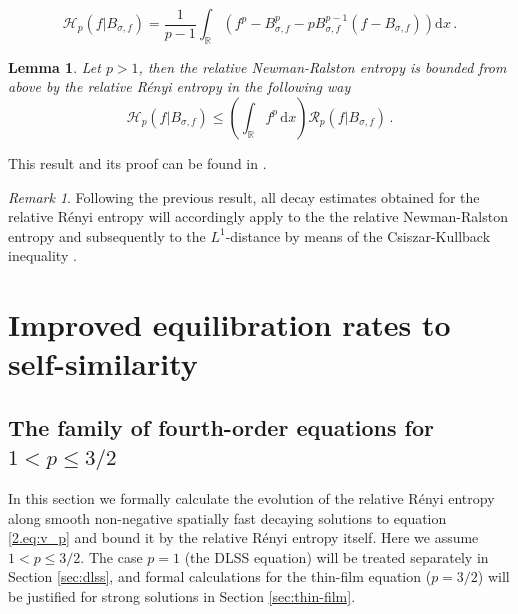 \documentclass[12pt]{amsart}
\newcommand{\R}{{\mathbb R}}
\newcommand{\renyi}{{\mathcal{R}}}
\newcommand{\dd}{{\mathrm{d}}}
\newcommand{\entropy}{\mathcal{H}}
\theoremstyle{plain}
\newtheorem{lemma}[theorem]{Lemma}
\theoremstyle{definition}
\theoremstyle{remark}
\newtheorem{remark}{Remark}[section]
\begin{document}
\begin{equation*}
    \entropy_p(f|B_{\sigma,f}) = \frac{1}{p-1}\int_{\R}\left(f^p - B_{\sigma,f}^p - pB_{\sigma,f}^{p-1}(f - B_{\sigma,f})\right)\dd x\,.
\end{equation*}
\begin{lemma}\label{lem:NR-ren}
    Let $p>1$, then the relative Newman-Ralston entropy is bounded from above by the relative R\'enyi entropy in the following way
    \begin{equation*}
        \entropy_p(f|B_{\sigma,f}) \leq \left(\int_{\R}f^p\,\dd x\right)\renyi_p(f|B_{\sigma,f})\,.
    \end{equation*}
\end{lemma}
\noindent This result and its proof can be found in \cite[Lemma 4.2]{CaTo14}.

\begin{remark}
    Following the previous result, all decay estimates obtained for the relative R\'enyi entropy will accordingly apply to the the relative Newman-Ralston entropy and subsequently to the $L^1$-distance by means of the Csiszar-Kullback inequality \cite{CJMTU01}.
\end{remark}



\section{Improved equilibration rates to self-similarity} \label{sec:3}

\subsection{The family of fourth-order equations for $1< p \leq 3/2$}\label{sec:3.p}

In this section we formally calculate the evolution of the relative R\'enyi entropy along smooth non-negative spatially fast decaying solutions to equation \eqref{2.eq:v_p} and bound it by the relative R\'enyi entropy itself. Here we assume $1 < p \leq 3/2$. The case $p=1$ (the DLSS equation) will be treated separately in Section \ref{sec:dlss}, and formal calculations for the thin-film equation ($p=3/2$) will be justified for strong solutions in Section \ref{sec:thin-film}.
\end{document}
